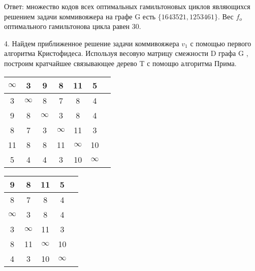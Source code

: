 \documentclass[a4paper,10pt]{article} %
\begin{document}
\bigskip

{\large
Ответ: множество кодов всех оптимальных гамильтоновых циклов являющихся решением задачи коммивояжера на графе G есть $\{1643521, 1253461 \}$. Вес $f_o$ оптимального гамильтонова цикла равен 30.
}

\newpage


4. \quad Найдем приближенное решение задачи коммивояжера $v_1$ с помощью первого алгоритма Кристофидеса. Используя весовую матрицу смежности D графа G , построим кратчайшее связывающее дерево T с помощю алгоритма Прима.

\medskip



\begin{tabular}[]{|c|c|c|c|c|c|c|}
\hline
$\infty$ &    3 &    9 &    8 &   11 &    5 \\
\hline
  3 &  $\infty$ &    8 &    7 &    8 &    4 \\
\hline
  9 &    8 &  $\infty$ &    3 &    8 &    4 \\
\hline
  8 &    7 &    3 &  $\infty$ &   11 &    3 \\
\hline
 11 &    8 &    8 &   11 &  $\infty$ &   10 \\
\hline
  5 &    4 &    4 &    3 &   10 &  $\infty$ \\
\hline
\end{tabular}
\hspace{4cm}
\begin{tabular}[]{|c|c|c|c|c|}
\hline
\rowcolor{lightgray}     9 &    8 &   11 &    5 \\
\hline
 \rowcolor{lightgray}     8 &    7 &    8 &    4 \\
\hline
  $\infty$ &    3 &    8 &    4 \\
\hline
    3 &  $\infty$ &   11 &    3 \\
\hline
    8 &   11 &  $\infty$ &   10 \\
\hline
    4 &    3 &   10 &  $\infty$ \\
\hline
\end{tabular}

\medskip
\end{document}
